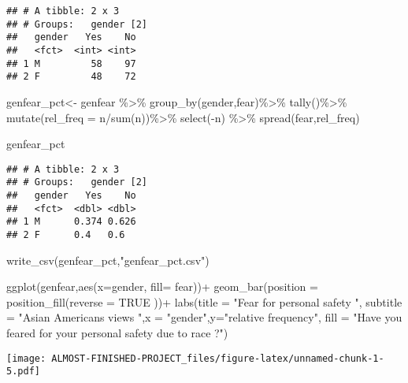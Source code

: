 \documentclass[
]{article}
\newenvironment{Shaded}{\begin{snugshade}}{\end{snugshade}}
\newcommand{\AttributeTok}[1]{\textcolor[rgb]{0.77,0.63,0.00}{#1}}
\newcommand{\ConstantTok}[1]{\textcolor[rgb]{0.00,0.00,0.00}{#1}}
\newcommand{\FunctionTok}[1]{\textcolor[rgb]{0.00,0.00,0.00}{#1}}
\newcommand{\NormalTok}[1]{#1}
\newcommand{\OtherTok}[1]{\textcolor[rgb]{0.56,0.35,0.01}{#1}}
\newcommand{\SpecialCharTok}[1]{\textcolor[rgb]{0.00,0.00,0.00}{#1}}
\newcommand{\StringTok}[1]{\textcolor[rgb]{0.31,0.60,0.02}{#1}}
\begin{document}
\begin{verbatim}
## # A tibble: 2 x 3
## # Groups:   gender [2]
##   gender   Yes    No
##   <fct>  <int> <int>
## 1 M         58    97
## 2 F         48    72
\end{verbatim}

\begin{Shaded}
\begin{Highlighting}[]
\NormalTok{genfear\_pct}\OtherTok{\textless{}{-}}\NormalTok{ genfear }\SpecialCharTok{\%\textgreater{}\%}
  \FunctionTok{group\_by}\NormalTok{(gender,fear)}\SpecialCharTok{\%\textgreater{}\%}
  \FunctionTok{tally}\NormalTok{()}\SpecialCharTok{\%\textgreater{}\%}
  \FunctionTok{mutate}\NormalTok{(}\AttributeTok{rel\_freq =}\NormalTok{ n}\SpecialCharTok{/}\FunctionTok{sum}\NormalTok{(n))}\SpecialCharTok{\%\textgreater{}\%}
  \FunctionTok{select}\NormalTok{(}\SpecialCharTok{{-}}\NormalTok{n) }\SpecialCharTok{\%\textgreater{}\%}
  \FunctionTok{spread}\NormalTok{(fear,rel\_freq) }

\NormalTok{genfear\_pct}
\end{Highlighting}
\end{Shaded}

\begin{verbatim}
## # A tibble: 2 x 3
## # Groups:   gender [2]
##   gender   Yes    No
##   <fct>  <dbl> <dbl>
## 1 M      0.374 0.626
## 2 F      0.4   0.6
\end{verbatim}

\begin{Shaded}
\begin{Highlighting}[]
\FunctionTok{write\_csv}\NormalTok{(genfear\_pct,}\StringTok{"genfear\_pct.csv"}\NormalTok{)}

\FunctionTok{ggplot}\NormalTok{(genfear,}\FunctionTok{aes}\NormalTok{(}\AttributeTok{x=}\NormalTok{gender, }\AttributeTok{fill=}\NormalTok{ fear))}\SpecialCharTok{+}
  \FunctionTok{geom\_bar}\NormalTok{(}\AttributeTok{position =} \FunctionTok{position\_fill}\NormalTok{(}\AttributeTok{reverse =} \ConstantTok{TRUE}\NormalTok{ ))}\SpecialCharTok{+} 
  \FunctionTok{labs}\NormalTok{(}\AttributeTok{title =} \StringTok{"Fear for personal safety "}\NormalTok{,}
       \AttributeTok{subtitle =} \StringTok{"Asian Americans views "}\NormalTok{,}\AttributeTok{x =} \StringTok{"gender"}\NormalTok{,}\AttributeTok{y=}\StringTok{"relative frequency"}\NormalTok{, }
       \AttributeTok{fill =} \StringTok{"Have you feared for your personal safety due to race  ?"}\NormalTok{)}
\end{Highlighting}
\end{Shaded}

\texttt{[image: ALMOST-FINISHED-PROJECT\_files/figure-latex/unnamed-chunk-1-5.pdf]}
\end{document}
